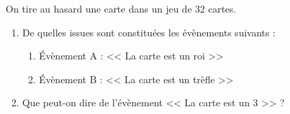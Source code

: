 On tire au hasard une carte dans un jeu de 32 cartes.
\begin{enumerate}
    \item De quelles issues sont constituées les évènements suivants :
    \begin{multicols}{2}
    \begin{enumerate}
        \item Évènement A : << La carte est un roi >>
        \item Évènement B : << La carte est un trèfle >>
    \end{enumerate}
    \end{multicols}

    \item Que peut-on dire de l'évènement << La carte est un 3 >> ?
\end{enumerate}